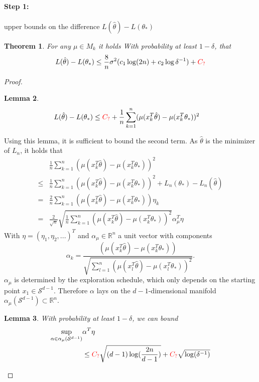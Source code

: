 \documentclass[twoside]{article} \usepackage{aistats2017}
\newtheorem{theorem}{Theorem}
\newtheorem{lemma}[theorem]{Lemma}
\newcommand{\uc}{
\color{red}C_?\color{black}
}
\begin{document}
\paragraph{Step 1: } upper bounds on the difference $L(\hat{\theta})-L(\theta_*)$
\begin{theorem}
    For any $\mu\in M_k$ it holds With probability at least $1-\delta$, that 
    $$
    L(\hat{\theta})-L(\theta_*)\leq \frac{8}{n}\sigma^2(c_1\log(2n)+c_2\log{\delta^{-1}})+\uc
    $$
\end{theorem}
\begin{proof}
\begin{lemma}\label{intapprox}
\begin{align*}
&L(\hat{\theta})-L(\theta_*) \leq\uc + \frac{1}{n}\sum_{k=1}^n(\mu(x_k^T\hat{\theta})-\mu(x_k^T\theta_*))^2
\end{align*}
\end{lemma}
Using this lemma, it is sufficient to bound the second term.
As $\hat{\theta}$ is the minimizer of $L_n$, it holds that
    \begin{align*}
        &\frac{1}{n}\sum_{k=1}^n(\mu(x_k^T\hat{\theta})-\mu(x_k^T\theta_*))^2 \\
        \leq &\frac{1}{n}\sum_{k=1}^n(\mu(x_k^T\hat{\theta})-\mu(x_k^T\theta_*))^2 + L_n(\theta_*)-L_n(\hat{\theta})\\
        = &\frac{2}{n}\sum_{k=1}^n(\mu(x_k^T\hat{\theta})-\mu(x_k^T\theta_*))\eta_k\\
        = &\frac{2}{\sqrt{n}}\sqrt{\frac{1}{n}\sum_{k=1}^n(\mu(x_k^T\hat{\theta})-\mu(x_k^T\theta_*))^2}\alpha_\mu^T\eta
\end{align*}
With $\eta=(\eta_1,\eta_2,...)^T$ and $\alpha_\mu\in\mathbb{R}^n$ a unit vector with components
$$\alpha_k = \frac{(\mu(x_k^T\hat{\theta})-\mu(x_k^T\theta_*))}{\sqrt{\sum_{l=1}^n(\mu(x_l^T\hat{\theta})-\mu(x_l^T\theta_*))^2}}.$$
$\alpha_\mu$ is determined by the exploration schedule, which only depends on the starting point $x_1\in\mathcal{S}^{d-1}$. Therefore $\alpha$ lays on the $d-1$-dimensional manifold $\alpha_\mu(\mathcal{S}^{d-1})\subset \mathbb{R}^n$.
\begin{lemma}\label{supbound}
    With probability at least $1-\delta$, we can bound
    \begin{align*}
    \sup_{\alpha\in\alpha_\mu(\mathcal{S}^{d-1})}&\alpha^T\eta\\
    &\leq \uc\sqrt{(d-1)\log(\frac{2n}{d-1})}+\uc\sqrt{\log(\delta^{-1})}
    \end{align*}
\end{lemma}

\end{proof}
\end{document}
